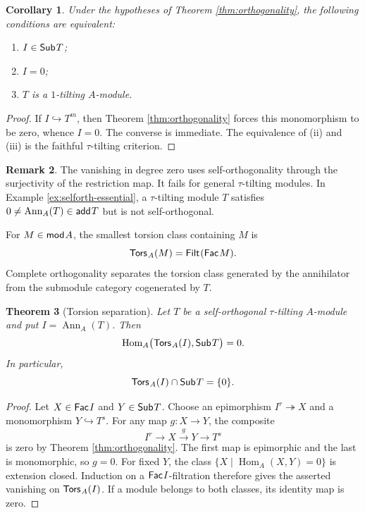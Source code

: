 \documentclass[a4paper,reqno]{amsart}
\newtheorem{theorem}{Theorem}[section]
\newtheorem{corollary}[theorem]{Corollary}
\theoremstyle{definition}
\newtheorem{remark}[theorem]{Remark}
\newcommand{\Hom}{\operatorname{Hom}\nolimits}
\newcommand{\Ann}{\operatorname{Ann}\nolimits}
\newcommand{\add}{\mathsf{add}\hspace{.01in}}
\newcommand{\Fac}{\mathsf{Fac}\hspace{.01in}}
\newcommand{\Filt}{\mathsf{Filt}\hspace{.01in}}
\newcommand{\Sub}{\mathsf{Sub}\hspace{.01in}}
\newcommand{\Tors}{\mathsf{Tors}\hspace{.01in}}
\newcommand{\modA}{\mathsf{mod}\hspace{.01in}A}
\numberwithin{equation}{section}
\begin{document}
\begin{corollary}\label{cor:sub-equivalence}
Under the hypotheses of Theorem \ref{thm:orthogonality}, the following
conditions are equivalent:
\begin{enumerate}[\rm(i)]
\item $I\in\Sub T$;
\item $I=0$;
\item $T$ is a $1$-tilting $A$-module.
\end{enumerate}
\end{corollary}

\begin{proof}
If $I\hookrightarrow T^m$, then Theorem \ref{thm:orthogonality}
forces this monomorphism to be zero, whence $I=0$. The converse is
immediate. The equivalence of (ii) and (iii) is the faithful
$\tau$-tilting criterion.
\end{proof}

\begin{remark}\label{rem:selforth-essential-preview}
The vanishing in degree zero uses self-orthogonality through the
surjectivity of the restriction map. It fails for general
$\tau$-tilting modules. In Example \ref{ex:selforth-essential}, a
$\tau$-tilting module $T$ satisfies
$0\neq\Ann_A(T)\in\add T$ but is not self-orthogonal.
\end{remark}

For $M\in\modA$, the smallest torsion class containing $M$ is
\[
                       \Tors_A(M)=\Filt(\Fac M).
\]
Complete orthogonality separates the torsion class generated by the
annihilator from the submodule category cogenerated by $T$.

\begin{theorem}[Torsion separation]\label{thm:torsion-separation}
Let $T$ be a self-orthogonal $\tau$-tilting $A$-module and put
$I=\Ann_A(T)$.  Then
\[
       \Hom_A\bigl(\Tors_A(I),\Sub T\bigr)=0.
\]
In particular,
\[
                     \Tors_A(I)\cap\Sub T=\{0\}.
\]
\end{theorem}

\begin{proof}
Let $X\in\Fac I$ and $Y\in\Sub T$. Choose an epimorphism
$I^r\twoheadrightarrow X$ and a monomorphism $Y\hookrightarrow T^s$.
For any map $g:X\to Y$, the composite
\[
              I^r\longrightarrow X\xrightarrow{g}Y
              \longrightarrow T^s
\]
is zero by Theorem \ref{thm:orthogonality}. The first map is
epimorphic and the last is monomorphic, so $g=0$. For fixed $Y$, the
class $\{X\mid\Hom_A(X,Y)=0\}$ is extension closed. Induction on a
$\Fac I$-filtration therefore gives the asserted vanishing on
$\Tors_A(I)$. If a module belongs to both classes, its identity map
is zero.
\end{proof}
\end{document}

